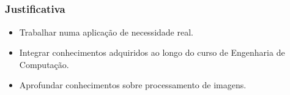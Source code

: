 \subsection{}
    \begin{frame}\frametitle{Justificativa}
        \begin{itemize}
            \item Trabalhar numa aplicação de necessidade real.
            \item Integrar conhecimentos adquiridos ao longo do curso de Engenharia de Computação.
            \item Aprofundar conhecimentos sobre processamento de imagens.
        \end{itemize}
    \end{frame} 

